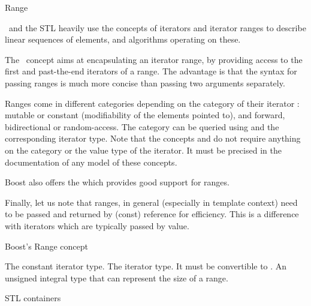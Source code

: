 \begin{ccRefConcept}{Range}

\ccDefinition

\cgal\ and the STL heavily use the concepts of iterators and iterator ranges
to describe linear sequences of elements, and algorithms operating on these.

The \ccRefName\ concept aims at encapsulating an iterator range, by providing
access to the first and past-the-end iterators of a range.  The advantage is
that the syntax for passing ranges is much more concise than passing two
arguments separately.


Ranges come in different categories depending on the category of their iterator :
mutable or constant (modifiability of the elements pointed to), and forward,
bidirectional or random-access.  The category can be queried using
 and the corresponding iterator type.  Note that
the concepts  and  do not require anything on
the category or the value type of the iterator.  It must be precised in the
documentation of any model of these concepts.

Boost also offers the
which provides good support for ranges.

Finally, let us note that ranges, in general (especially in template context)
need to be passed and returned by (const) reference for efficiency.  This is a
difference with iterators which are typically passed by value.

\ccRefines


Boost's Range concept

{}  %

\ccTypes

 {The constant iterator type.}
 {The iterator type.  It must be convertible to .}
 {An unsigned integral type that can represent the
  size of a range.} 


\def\ccTagRmTrailingConst{\ccFalse}

\ccGlue
{}
\ccGlue
{}
\ccGlue
{}

\ccGlue
{}

\def\ccTagRmTrailingConst{\ccTrue}

\ccHasModels
STL containers\\
%
{}

\end{ccRefConcept}
